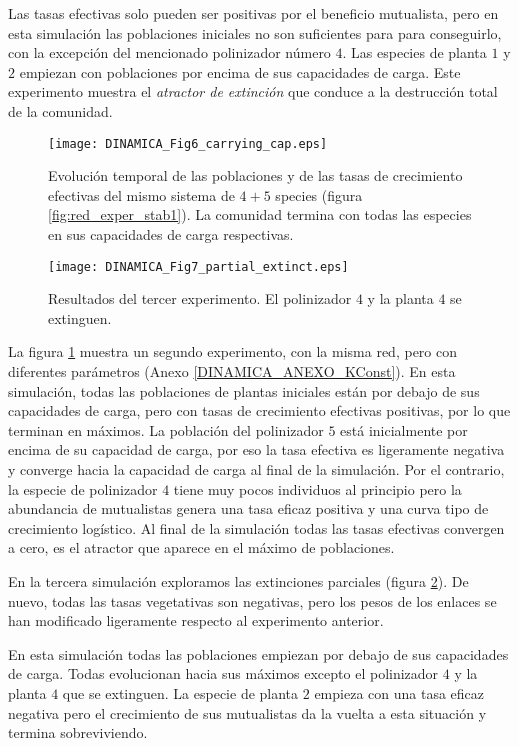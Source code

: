 Las tasas efectivas solo pueden ser positivas por el beneficio mutualista, pero en esta simulación las poblaciones iniciales no son suficientes para para conseguirlo, con la excepción del mencionado polinizador número $4$. Las especies de planta $1$ y $2$ empiezan con poblaciones por encima de sus capacidades de carga.
Este experimento muestra el \textit{atractor de extinción} que conduce a la destrucción total de la comunidad.

\begin{figure}[ht!]
\centering
\texttt{[image: DINAMICA\_Fig6\_carrying\_cap.eps]}
\caption {Evolución temporal de las poblaciones y de las tasas de crecimiento efectivas del mismo sistema de $4+5$ species (figura \ref{fig:red_exper_stab1}). La comunidad termina con todas las especies en sus capacidades de carga respectivas.}
\label{fig:exper_carrying_cap}
\end{figure}

\begin{figure}[h!]
\centering
\texttt{[image: DINAMICA\_Fig7\_partial\_extinct.eps]}
\caption {Resultados del tercer experimento. El polinizador $4$ y la planta $4$ se extinguen.}
\label{fig:exper_stab2}
\end{figure}

La figura \ref{fig:exper_carrying_cap} muestra un segundo experimento, con la misma red, pero con diferentes parámetros (Anexo \ref{DINAMICA_ANEXO_KConst}). En esta simulación, todas las poblaciones de plantas iniciales están por debajo de sus capacidades de carga, pero con tasas de crecimiento efectivas positivas, por lo que terminan en máximos. La población del polinizador $5$ está inicialmente por encima de su capacidad de carga, por eso la tasa efectiva es ligeramente negativa y converge hacia la capacidad de carga al final de la simulación. Por el contrario, la especie de polinizador $4$ tiene muy pocos individuos al principio pero la abundancia de mutualistas genera una tasa eficaz positiva y una curva tipo de crecimiento logístico. Al final de la simulación todas las tasas efectivas convergen a cero, es el atractor que aparece en el máximo de poblaciones.

En la tercera simulación exploramos las extinciones parciales (figura \ref{fig:exper_stab2}). De nuevo, todas las tasas vegetativas son negativas, pero los pesos de los enlaces se han modificado ligeramente respecto al experimento anterior.

En esta simulación todas las poblaciones empiezan por debajo de sus capacidades de carga. Todas evolucionan hacia sus máximos excepto el polinizador $4$ y la planta $4$ que se extinguen. La especie de planta $2$ empieza con una tasa eficaz negativa pero el crecimiento de sus mutualistas da la vuelta a esta situación y termina sobreviviendo.

